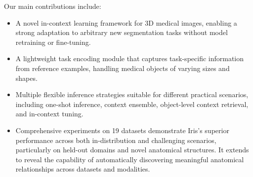 Our main contributions include:
\begin{itemize}
\item A novel in-context learning framework for 3D medical images, enabling a strong adaptation to arbitrary new segmentation tasks without model retraining or fine-tuning.
\item A lightweight task encoding module that captures task-specific information from reference examples, handling medical objects of varying sizes and shapes.
\item Multiple flexible inference strategies suitable for different practical scenarios, including one-shot inference, context ensemble, object-level context retrieval, and in-context tuning.
\item Comprehensive experiments on 19 datasets demonstrate Iris's superior performance across both in-distribution and challenging scenarios, particularly on held-out domains and novel anatomical structures. It extends to reveal the capability of automatically discovering meaningful anatomical relationships across datasets and modalities.
\end{itemize}



